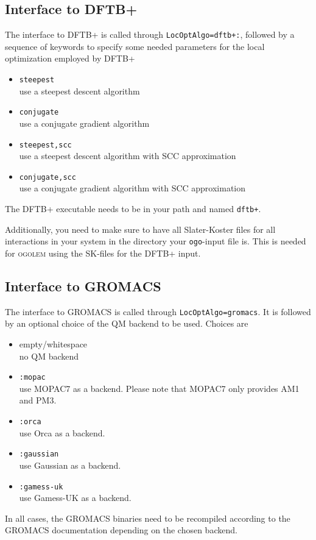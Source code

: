 \documentclass[a4paper,10pt]{scrbook}
\newcommand{\ogo}{\textsc{ogolem}}
\begin{document}


\subsection{Interface to DFTB+}
The interface to DFTB+ is called through \texttt{LocOptAlgo=dftb+:}, followed
by a sequence of keywords to specify some needed parameters for the local
optimization employed by DFTB+
\begin{itemize}
  \item \texttt{steepest}\\
	use a steepest descent algorithm
  \item \texttt{conjugate}\\
	use a conjugate gradient algorithm
  \item \texttt{steepest,scc}\\
	use a steepest descent algorithm with SCC approximation
  \item \texttt{conjugate,scc}\\
	use a conjugate gradient algorithm with SCC approximation
\end{itemize}

The DFTB+ executable needs to be in your path and named \texttt{dftb+}.

Additionally, you need to make sure to have all Slater-Koster files for all
interactions in your system in the directory your \texttt{ogo}-input file is.
This is needed for \ogo{} using the SK-files for the DFTB+ input.

\subsection{Interface to GROMACS}
The interface to GROMACS is called through \texttt{LocOptAlgo=gromacs}. It is
followed by an optional choice of the QM backend to be used. Choices are
\begin{itemize}
  \item empty/whitespace\\
	no QM backend
  \item \texttt{:mopac}\\
	use MOPAC7 as a backend. Please note that MOPAC7 only provides AM1 and
PM3.
  \item \texttt{:orca}\\
	use Orca as a backend.
  \item \texttt{:gaussian}\\
	use Gaussian as a backend.
  \item \texttt{:gamess-uk}\\
	use Gamess-UK as a backend.
\end{itemize}
In all cases, the GROMACS binaries need to be recompiled according to the
GROMACS documentation depending on the chosen backend.
\end{document}
